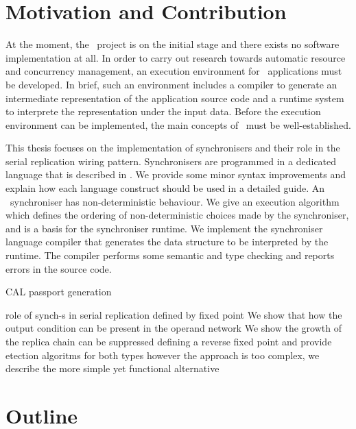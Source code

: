     \section{Motivation and Contribution}
At the moment, the \ak\ project is on the initial stage and there exists no software implementation at all. In order to carry out research towards automatic resource and concurrency management, an execution environment for \ak\ applications must be developed. In brief, such an environment includes a compiler to generate an intermediate representation of the application source code and a runtime system to interprete the representation under the input data. Before the execution environment can be implemented, the main concepts of \ak\ must be well-established.

This thesis focuses on the implementation of synchronisers and their role in the serial replication wiring pattern. Synchronisers are programmed in a dedicated language that is described in \cite{astrakahn}. We provide some minor syntax improvements and explain how each language construct should be used in a detailed guide. An \ak\ synchroniser has non-deterministic behaviour. We give an execution algorithm which defines the ordering of non-deterministic choices made by the synchroniser, and is a basis for the synchroniser runtime. We implement the synchroniser language compiler that generates the data structure to be interpreted by the runtime. The compiler performs some semantic and type checking and reports errors in the source code.



CAL passport generation


role of synch-s in serial replication defined by fixed point
We show that how the output condition can be present in the operand network
We show the growth of the replica chain can be suppressed defining a reverse fixed point
and provide etection algoritms for both types
however the approach is too complex, we describe the more simple yet functional alternative


    \section{Outline}



